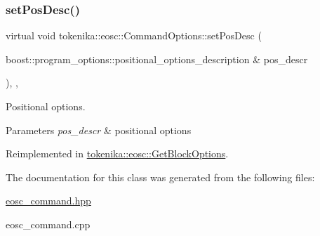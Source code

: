 \subsubsection{\texorpdfstring{set\+Pos\+Desc()}{setPosDesc()}}
{\footnotesize\ttfamily virtual void tokenika\+::eosc\+::\+Command\+Options\+::set\+Pos\+Desc (\begin{DoxyParamCaption}\item[{boost\+::program\+\_\+options\+::positional\+\_\+options\+\_\+description \&}]{pos\+\_\+descr }\end{DoxyParamCaption})\hspace{0.3cm}{\ttfamily [inline]}, {\ttfamily [protected]}, {\ttfamily [virtual]}}



Positional options. 


\begin{DoxyParams}{Parameters}
{\em pos\+\_\+descr} & positional options \\
\hline
\end{DoxyParams}


Reimplemented in \hyperlink{classtokenika_1_1eosc_1_1_get_block_options_ac6f55ff885c6a553a16ee0b09a0d9da1}{tokenika\+::eosc\+::\+Get\+Block\+Options}.



The documentation for this class was generated from the following files\+:\begin{DoxyCompactItemize}
\item 
\hyperlink{eosc__command_8hpp}{eosc\+\_\+command.\+hpp}\item 
eosc\+\_\+command.\+cpp\end{DoxyCompactItemize}
